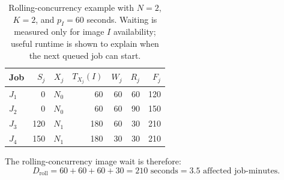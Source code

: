 \documentclass[11pt,a4paper]{article}
\begin{document}
\begin{table}[H]
\centering
\caption{Rolling-concurrency example with \(N=2\), \(K=2\), and \(p_I=60\) seconds. Waiting is measured only for image \(I\) availability; useful runtime is shown to explain when the next queued job can start.}
\label{tab:rolling-example}
\small
\begin{tabular}{lrrrrrr}
\toprule
Job & \(S_j\) & \(X_j\) & \(T_{X_j}(I)\) & \(W_j\) & \(R_j\) & \(F_j\) \\
\midrule
\(J_1\) & 0 & \(N_0\) & 60 & 60 & 60 & 120 \\
\(J_2\) & 0 & \(N_0\) & 60 & 60 & 90 & 150 \\
\(J_3\) & 120 & \(N_1\) & 180 & 60 & 30 & 210 \\
\(J_4\) & 150 & \(N_1\) & 180 & 30 & 30 & 210 \\
\bottomrule
\end{tabular}
\end{table}

The rolling-concurrency image wait is therefore:
\begin{equation}
  D_{\mathrm{roll}}
  =
  60 + 60 + 60 + 30
  =
  210\text{ seconds}
  =
  3.5\text{ affected job-minutes}.
\end{equation}
\end{document}

